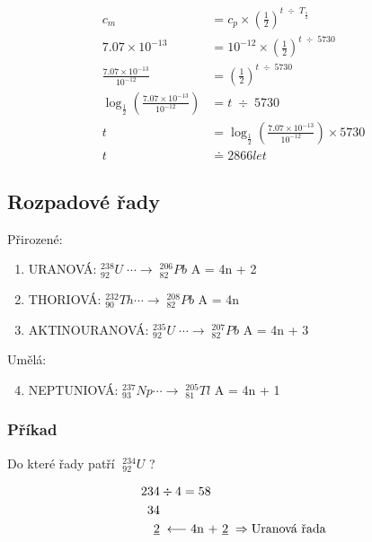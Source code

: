 \begin{align*}
    c_{m} &= c_{p} \times \left(\frac{1}{2}\right)^{t \; \div \;  T_{\frac{1}{2}}} \\
    7.07 \times 10^{-13} &= 10^{-12} \times \left(\frac{1}{2}\right)^{t \; \div \;  5730} \\
    \frac{7.07 \times 10^{-13}}{10^{-12}} &= \left(\frac{1}{2}\right)^{t \; \div \;  5730} \\
    \log_{\frac{1}{2}}\left(\frac{7.07 \times 10^{-13}}{10^{-12}}\right) &= t \; \div \;  5730 \\
    t &= \log_{\frac{1}{2}}\left(\frac{7.07 \times 10^{-13}}{10^{-12}}\right) \times 5730 \\
    t &\doteq 2866 let
\end{align*}

\TabPositions{0em, 15em, 30em}
\subsection{Rozpadové řady}
Přirozené:
\begin{enumerate}
    \item URANOVÁ: \tab $^{238}_{92}U \; \cdots \longrightarrow \; ^{206}_{82}Pb$ \tab A = 4n + 2
    \item THORIOVÁ: \tab $^{232}_{90}Th \cdots \longrightarrow \; ^{208}_{82}Pb$ \tab A = 4n
    \item AKTINOURANOVÁ: \tab $^{235}_{92}U \; \cdots \longrightarrow \; ^{207}_{82}Pb$ \tab A = 4n + 3 
\end{enumerate}

Umělá:
\begin{enumerate}
    \setcounter{enumi}{3}
    \item NEPTUNIOVÁ: \tab $^{237}_{93}Np \cdots \longrightarrow \; ^{205}_{81}Tl$ \tab A = 4n + 1
\end{enumerate}

\subsubsection{Příkad}
Do které řady patří $\; ^{234}_{92}U$ ?

\begin{align*}
    234&\div 4 = 58 \\
    34& \\
    \underline{2}& \; \longleftarrow \mbox{4n + \underline{2}} \; \Rightarrow \mbox{Uranová řada}\\
\end{align*}


